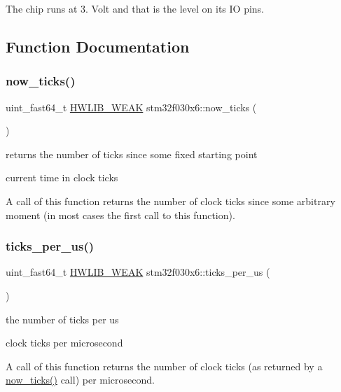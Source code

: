 The chip runs at 3. Volt and that is the level on its IO pins. 

\subsection{Function Documentation}
\mbox{\label{namespacestm32f030x6_ae284e9d77fe0c507568353cc5f0129f6}} 
\subsubsection{\texorpdfstring{now\+\_\+ticks()}{now\_ticks()}}
{\footnotesize\ttfamily uint\+\_\+fast64\+\_\+t \hyperlink{hwlib-defines_8hpp_a04be4340016df60d6636c1d1c6d94fc9}{H\+W\+L\+I\+B\+\_\+\+W\+E\+AK} stm32f030x6\+::now\+\_\+ticks (\begin{DoxyParamCaption}{ }\end{DoxyParamCaption})}



returns the number of ticks since some fixed starting point 

current time in clock ticks

A call of this function returns the number of clock ticks since some arbitrary moment (in most cases the first call to this function). \mbox{\label{namespacestm32f030x6_a27427bc351a5ba91ea69a3be5d1b27de}} 
\subsubsection{\texorpdfstring{ticks\+\_\+per\+\_\+us()}{ticks\_per\_us()}}
{\footnotesize\ttfamily uint\+\_\+fast64\+\_\+t \hyperlink{hwlib-defines_8hpp_a04be4340016df60d6636c1d1c6d94fc9}{H\+W\+L\+I\+B\+\_\+\+W\+E\+AK} stm32f030x6\+::ticks\+\_\+per\+\_\+us (\begin{DoxyParamCaption}{ }\end{DoxyParamCaption})}



the number of ticks per us 

clock ticks per microsecond

A call of this function returns the number of clock ticks (as returned by a \hyperlink{namespacestm32f030x6_ae284e9d77fe0c507568353cc5f0129f6}{now\+\_\+ticks()} call) per microsecond. \mbox{\label{namespacestm32f030x6_a6d4aa0ce390d76e08a757100ddc0c7e8}} 
